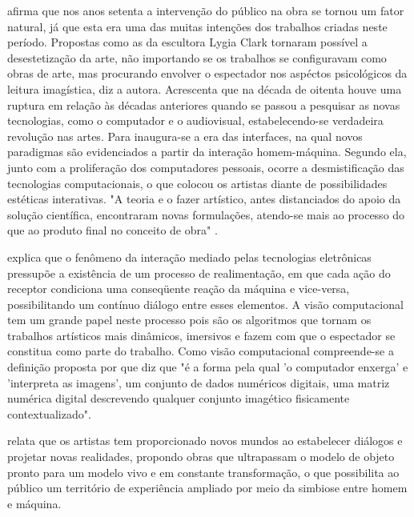  afirma que nos anos setenta a intervenção do público na obra se tornou um fator natural, já que esta era uma das muitas intenções dos trabalhos criadas neste período. Propostas como as da escultora Lygia Clark tornaram possível a desestetização da arte, não importando se os trabalhos se configuravam como obras de arte, mas procurando envolver o espectador nos aspéctos psicológicos da leitura imagística, diz a autora. Acrescenta que na década de oitenta houve uma ruptura em relação às décadas anteriores quando se passou a pesquisar as novas tecnologias, como o computador e o audiovisual, estabelecendo-se verdadeira revolução nas artes. Para  inaugura-se a era das interfaces, na qual novos paradigmas são evidenciados a partir da interação homem-máquina. Segundo ela, junto com a proliferação dos computadores pessoais, ocorre a desmistificação das tecnologias computacionais, o que colocou os artistas diante de possibilidades estéticas interativas. "A teoria e o fazer artístico, antes distanciados do apoio da solução científica, encontraram novas formulações, atendo-se mais ao processo do que ao produto final no conceito de obra" \cite[p. 78]{rahde}.

 explica que o fenômeno da interação mediado pelas tecnologias eletrônicas pressupõe a existência de um processo de realimentação, em que cada ação do receptor condiciona uma conseqüente reação da máquina e vice-versa, possibilitando um contínuo diálogo entre esses elementos. A visão computacional tem um grande papel neste processo pois são os algoritmos que tornam os trabalhos artísticos mais dinâmicos, imersivos e fazem com que o espectador se constitua como parte do trabalho. Como visão computacional compreende-se a definição proposta por  que diz que "é a forma pela qual 'o computador enxerga' e 'interpreta as imagens', um conjunto de dados numéricos digitais, uma matriz numérica digital descrevendo qualquer conjunto imagético fisicamente contextualizado".

 relata que os artistas tem proporcionado novos mundos ao estabelecer diálogos e projetar novas realidades, propondo obras que ultrapassam o modelo de objeto pronto para um modelo vivo e em constante transformação, o que possibilita ao público um território de experiência ampliado por meio da simbiose entre homem e máquina.

